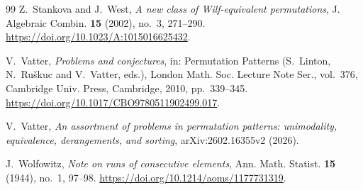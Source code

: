 \documentclass[11pt,reqno]{amsart}
\theoremstyle{plain}
\theoremstyle{definition}
\theoremstyle{remark}
\begin{document}
\begin{thebibliography}{99}
Z.~Stankova and J.~West, \emph{A new class of Wilf-equivalent permutations}, J. Algebraic Combin. \textbf{15} (2002), no.~3, 271--290. \url{https://doi.org/10.1023/A:1015016625432}.

V.~Vatter, \emph{Problems and conjectures}, in: Permutation Patterns (S.~Linton, N.~Ru\v{s}kuc and V.~Vatter, eds.), London Math. Soc. Lecture Note Ser., vol.~376, Cambridge Univ. Press, Cambridge, 2010, pp.~339--345. \url{https://doi.org/10.1017/CBO9780511902499.017}.

V.~Vatter, \emph{An assortment of problems in permutation patterns: unimodality, equivalence, derangements, and sorting}, arXiv:2602.16355v2 (2026).

J.~Wolfowitz, \emph{Note on runs of consecutive elements}, Ann. Math. Statist. \textbf{15} (1944), no.~1, 97--98. \url{https://doi.org/10.1214/aoms/1177731319}.

\end{thebibliography}
\end{document}
